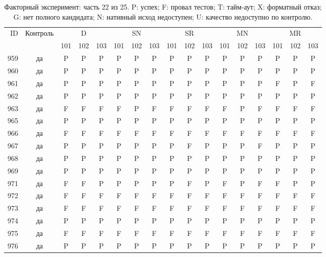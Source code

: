 \begin{table}[p]\centering\footnotesize
\setlength{\tabcolsep}{3pt}
\caption{Факторный эксперимент: часть 22 из 25. P: успех; F: провал тестов; T: тайм-аут; X: форматный отказ; G: нет полного кандидата; N: нативный исход недоступен; U: качество недоступно по контролю.}
\begin{tabular*}{\textwidth}{@{\extracolsep{\fill}}rcccccccccccccccc}\toprule
ID & Контроль & \multicolumn{3}{c}{D} & \multicolumn{3}{c}{SN} & \multicolumn{3}{c}{SR} & \multicolumn{3}{c}{MN} & \multicolumn{3}{c}{MR}\\
\cmidrule(lr){3-5}\cmidrule(lr){6-8}\cmidrule(lr){9-11}\cmidrule(lr){12-14}\cmidrule(lr){15-17}
 & & 101 & 102 & 103 & 101 & 102 & 103 & 101 & 102 & 103 & 101 & 102 & 103 & 101 & 102 & 103\\\midrule
959 & да & P & P & P & P & P & P & P & P & P & P & P & P & P & P & P\\
960 & да & P & P & P & P & P & P & P & P & P & P & P & P & P & P & P\\
961 & да & P & P & P & P & P & P & P & P & P & P & P & P & F & P & F\\
962 & да & P & P & P & P & P & P & P & P & P & P & P & P & P & P & P\\
963 & да & F & F & F & F & P & F & F & F & F & F & P & F & F & F & F\\
965 & да & P & P & P & P & P & P & P & P & P & P & P & P & P & P & P\\
966 & да & F & F & F & F & F & F & F & F & F & F & F & F & F & F & F\\
967 & да & P & P & P & P & P & P & P & F & P & P & P & F & P & P & P\\
968 & да & P & P & P & P & P & P & P & P & P & P & P & P & P & P & P\\
969 & да & P & P & P & P & P & P & P & P & P & P & P & P & P & P & P\\
971 & да & F & F & P & P & P & P & P & F & P & F & P & F & F & P & P\\
972 & да & F & F & F & F & F & F & F & F & F & F & F & F & F & F & F\\
973 & да & F & F & F & F & F & F & F & F & F & F & F & F & F & F & F\\
974 & да & P & P & P & P & P & P & P & P & P & P & P & P & P & P & P\\
975 & да & F & F & F & F & F & F & F & F & F & F & F & F & F & F & F\\
976 & да & P & P & P & P & P & P & P & P & P & P & P & P & P & P & P\\

\end{tabular*}
\end{table}
